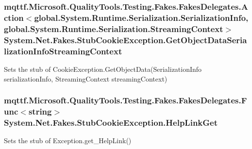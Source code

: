 \hypertarget{class_system_1_1_net_1_1_fakes_1_1_stub_cookie_exception_aeaec64d7763f3c1e6d10c736dae40ceb}{
\subsubsection[{Get\-Object\-Data\-Serialization\-Info\-Streaming\-Context}]{\setlength{\rightskip}{0pt plus 5cm}mqttf.\-Microsoft.\-Quality\-Tools.\-Testing.\-Fakes.\-Fakes\-Delegates.\-Action$<$global.\-System.\-Runtime.\-Serialization.\-Serialization\-Info, global.\-System.\-Runtime.\-Serialization.\-Streaming\-Context$>$ System.\-Net.\-Fakes.\-Stub\-Cookie\-Exception.\-Get\-Object\-Data\-Serialization\-Info\-Streaming\-Context}}\label{class_system_1_1_net_1_1_fakes_1_1_stub_cookie_exception_aeaec64d7763f3c1e6d10c736dae40ceb}


Sets the stub of Cookie\-Exception.\-Get\-Object\-Data(\-Serialization\-Info serialization\-Info, Streaming\-Context streaming\-Context)

\hypertarget{class_system_1_1_net_1_1_fakes_1_1_stub_cookie_exception_aa469ea6b27c112da85836f785b540543}{
\subsubsection[{Help\-Link\-Get}]{\setlength{\rightskip}{0pt plus 5cm}mqttf.\-Microsoft.\-Quality\-Tools.\-Testing.\-Fakes.\-Fakes\-Delegates.\-Func$<$string$>$ System.\-Net.\-Fakes.\-Stub\-Cookie\-Exception.\-Help\-Link\-Get}}\label{class_system_1_1_net_1_1_fakes_1_1_stub_cookie_exception_aa469ea6b27c112da85836f785b540543}


Sets the stub of Exception.\-get\-\_\-\-Help\-Link()

